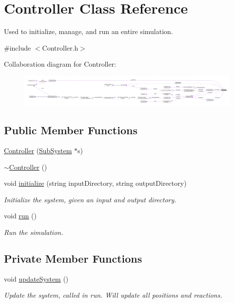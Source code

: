 \hypertarget{classController}{\section{Controller Class Reference}
\label{classController}
}


Used to initialize, manage, and run an entire simulation.  




{\ttfamily \#include $<$Controller.\+h$>$}



Collaboration diagram for Controller\+:\nopagebreak
\begin{figure}[H]
\begin{center}
\leavevmode
\includegraphics[width=350pt]{classController__coll__graph}
\end{center}
\end{figure}
\subsection*{Public Member Functions}
\begin{DoxyCompactItemize}
\item 
\hyperlink{classController_ab2466b5e31e9a19431fe36fa955fa8df}{Controller} (\hyperlink{classSubSystem}{Sub\+System} $\ast$s)
\item 
\hyperlink{classController_a0ab87934c4f7a266cfdb86e0f36bc1b5}{$\sim$\+Controller} ()
\item 
void \hyperlink{classController_a951b2e6eeec2ca5a966f4a84bfc7c7d1}{initialize} (string input\+Directory, string output\+Directory)
\begin{DoxyCompactList}\small\item\em Initialize the system, given an input and output directory. \end{DoxyCompactList}\item 
void \hyperlink{classController_a692f0f5dc600cdcb79786a31cf283ce1}{run} ()
\begin{DoxyCompactList}\small\item\em Run the simulation. \end{DoxyCompactList}\end{DoxyCompactItemize}
\subsection*{Private Member Functions}
\begin{DoxyCompactItemize}
\item 
void \hyperlink{classController_a5e23fe755f10aa6437d6eaccf4ec1ee1}{update\+System} ()
\begin{DoxyCompactList}\small\item\em Update the system, called in run. Will update all positions and reactions. \end{DoxyCompactList}\end{DoxyCompactItemize}
